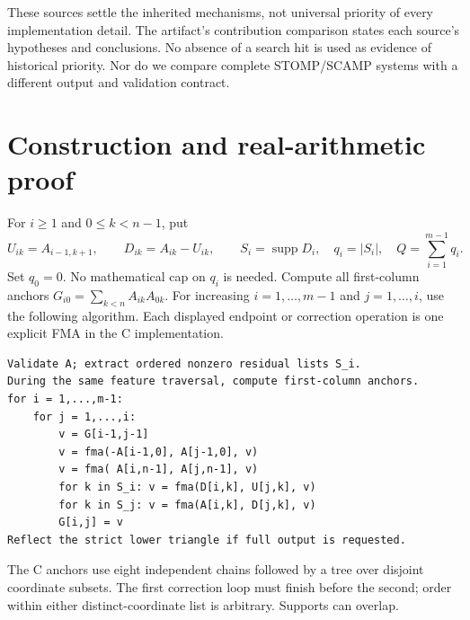 \documentclass[10pt,a4paper]{article}
\newcommand{\supp}{\operatorname{supp}}
\newcommand{\abs}[1]{\lvert#1\rvert}
\begin{document}
These sources settle the inherited mechanisms, not universal priority of every
implementation detail. The artifact's contribution comparison states each
source's hypotheses and conclusions. No absence of a search hit is used as
evidence of historical priority. Nor do we compare complete STOMP/SCAMP systems
with a different output and validation contract.

\section{Construction and real-arithmetic proof}
For $i\ge1$ and $0\le k<n-1$, put
\begin{equation}\label{eq:defects}
 U_{ik}=A_{i-1,k+1},\qquad D_{ik}=A_{ik}-U_{ik},\qquad
 S_i=\supp D_i,\quad q_i=\abs{S_i},\quad Q=\sum_{i=1}^{m-1}q_i.
\end{equation}
Set $q_0=0$. No mathematical cap on $q_i$ is needed. Compute all first-column
anchors $G_{i0}=\sum_{k<n}A_{ik}A_{0k}$. For increasing $i=1,\ldots,m-1$ and
$j=1,\ldots,i$, use the following algorithm. Each displayed endpoint or
correction operation is one explicit FMA in the C implementation.

\begin{center}
\begin{minipage}{.91\linewidth}
\small
\begin{verbatim}
Validate A; extract ordered nonzero residual lists S_i.
During the same feature traversal, compute first-column anchors.
for i = 1,...,m-1:
    for j = 1,...,i:
        v = G[i-1,j-1]
        v = fma(-A[i-1,0], A[j-1,0], v)
        v = fma( A[i,n-1], A[j,n-1], v)
        for k in S_i: v = fma(D[i,k], U[j,k], v)
        for k in S_j: v = fma(A[i,k], D[j,k], v)
        G[i,j] = v
Reflect the strict lower triangle if full output is requested.
\end{verbatim}
\end{minipage}
\end{center}
The C anchors use eight independent chains followed by a tree over disjoint
coordinate subsets. The first correction loop must finish before the second;
order within either distinct-coordinate list is arbitrary. Supports can overlap.
\end{document}
